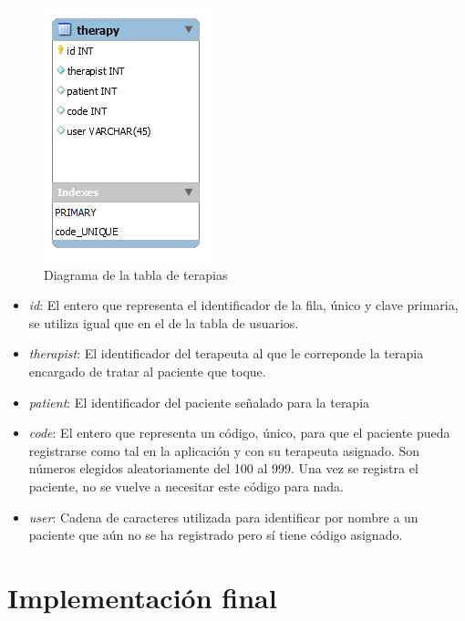 \begin{figure}[h]
	\centering
	\includegraphics[scale=1.0]{Imagenes/Vectorial/diagrama_tabla_therapy}
	\caption{Diagrama de la tabla de terapias}
	\label{fig:diagramatablatherapy}
\end{figure}

\begin{itemize}
	\item \textit{id}: El entero que representa el identificador de la fila, único y clave primaria, se utiliza igual que en el de la tabla de usuarios.
	\item \textit{therapist}: El identificador del terapeuta al que le correponde la terapia  encargado de tratar al paciente que toque.
	\item \textit{patient}: El identificador del paciente señalado para la terapia
	\item \textit{code}: El entero que representa un código, único, para que el paciente pueda registrarse como tal en la aplicación y con su terapeuta asignado. Son números elegidos aleatoriamente del 100 al 999. Una vez se registra el paciente, no se vuelve a necesitar este código para nada.
	\item \textit{user}: Cadena de caracteres utilizada para identificar por nombre a un paciente que aún no se ha registrado pero sí tiene código asignado.
\end{itemize}


\section{Implementación final}


